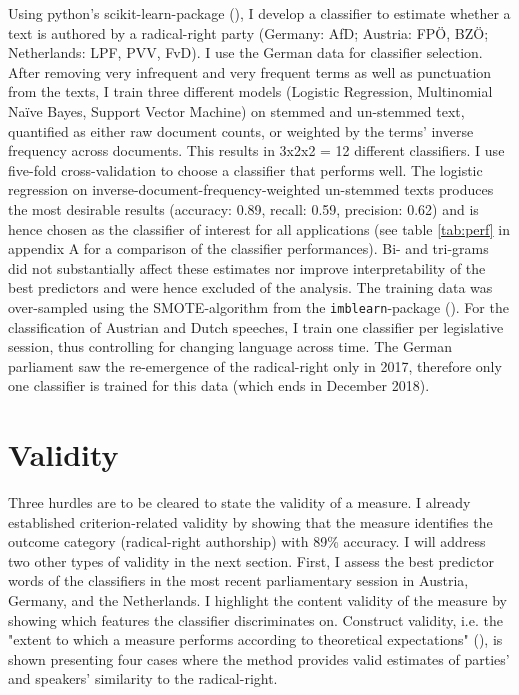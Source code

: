 \documentclass{article}
\begin{document}
Using python’s scikit-learn-package (\cite{Pedregosa2011}), I develop a classifier to estimate whether a text is authored by a radical-right party (Germany: AfD; Austria: FPÖ, BZÖ; Netherlands: LPF, PVV, FvD). I use the German data for classifier selection. After removing very infrequent and very frequent terms as well as punctuation from the texts, I train three different models (Logistic Regression, Multinomial Naïve Bayes, Support Vector Machine) on stemmed and un-stemmed text, quantified as either raw document counts, or weighted by the terms' inverse frequency across documents. This results in 3x2x2 = 12 different classifiers. I use five-fold cross-validation to choose a classifier that performs well. The logistic regression on inverse-document-frequency-weighted un-stemmed texts produces the most desirable results (accuracy: 0.89, recall: 0.59, precision: 0.62) and is hence chosen as the classifier of interest for all applications (see table \ref{tab:perf} in appendix A for a comparison of the classifier performances). Bi- and tri-grams did not substantially affect these estimates nor improve interpretability of the best predictors and were hence excluded of the analysis. The training data was over-sampled using the SMOTE-algorithm from the \texttt{imblearn}-package (\cite{Lemaitre2017}). For the classification of Austrian and Dutch speeches, I train one classifier per legislative session, thus controlling for changing language across time. The German parliament saw the re-emergence of the radical-right only in 2017, therefore only one classifier is trained for this data (which ends in December 2018). \par


\section{Validity}
Three hurdles are to be cleared to state the validity of a measure. I already established criterion-related validity by showing that the measure identifies the outcome category (radical-right authorship) with 89\% accuracy. I will address two other types of validity in the next section. First, I assess the best predictor words of the classifiers in the most recent parliamentary session in Austria, Germany, and the Netherlands. I highlight the content validity of the measure by showing which features the classifier discriminates on. Construct validity, i.e. the "extent to which a measure performs according to theoretical expectations" (\cite{Carmines2004Validity}), is shown presenting four cases where the method provides valid estimates of parties' and speakers' similarity to the radical-right. \par
\end{document}
